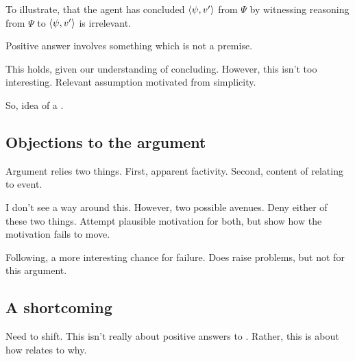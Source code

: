 \begin{note}
  To illustrate, that the agent has concluded \(\langle \psi, v' \rangle\) from \(\Psi\) by witnessing reasoning from \(\Psi\) to \(\langle \psi, v' \rangle\) is irrelevant.
\end{note}

\begin{note}
  \begin{corollary}
    Positive answer involves something which is not a premise.
  \end{corollary}

  This holds, given our understanding of concluding.
  However, this isn't too interesting.
  Relevant assumption motivated from simplicity.
\end{note}

\begin{note}
  So, idea of a \fc{}.
\end{note}

\subsection{Objections to the argument}
\label{sec:objections-argument}

\begin{note}
  Argument relies two things.
  First, apparent factivity.
  Second, content of \qzS{} relating to event.

  I don't see a way around this.
  However, two possible avenues.
  Deny either of these two things.
  Attempt plausible motivation for both, but show how the motivation fails to move.

  Following, a more interesting chance for failure.
  Does raise problems, but not for this argument.
\end{note}

\subsection{A shortcoming}
\label{sec:shortcoming}

\begin{note}
  \color{red}
  Need to shift.
  This isn't really about positive answers to \qzS{}.
  Rather, this is about how \qzS{} relates to why.
\end{note}

